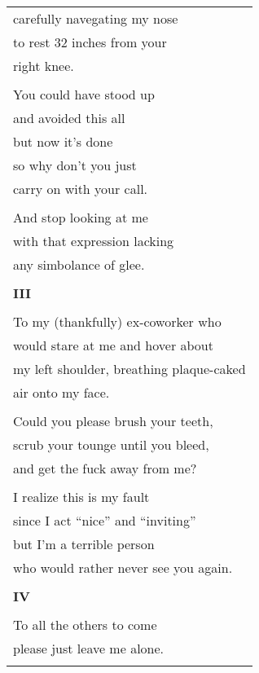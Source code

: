 \documentclass{article}
\begin{document}
\begin{center}
\begin{tabular}{l}
carefully navegating my nose \\
to rest 32 inches from your \\
right knee. \\
\\
You could have stood up \\
and avoided this all \\
but now it's done \\
so why don't you just \\
carry on with your call. \\
\\
And stop looking at me \\
with that expression lacking \\
any simbolance of glee. \\
\\
\textbf{III} \\
\\
To my (thankfully) ex-coworker who \\
would stare at me and hover about \\
my left shoulder, breathing plaque-caked \\
air onto my face. \\
\\
Could you please brush your teeth, \\
scrub your tounge until you bleed, \\
and get the fuck away from me? \\
\\
I realize this is my fault \\
since I act ``nice'' and ``inviting'' \\
but I'm a terrible person \\
who would rather never see you again. \\
\\
\textbf{IV} \\
\\
To all the others to come \\
please just leave me alone. \\
\\
\end{tabular}
\end{center}
\end{document}
